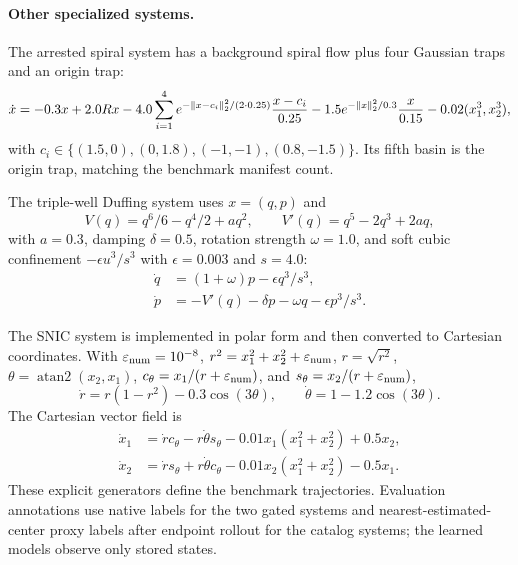 \paragraph{Other specialized systems.}
The arrested spiral system has a background spiral flow plus four Gaussian
traps and an origin trap:
\[
  \dot x
  =
  -0.3x+2.0Rx
  -4.0\sum_{i=1}^{4}
  e^{-\left\lVert x-c_i \right\rVert_2^2/(2\cdot0.25)}
  \frac{x-c_i}{0.25}
  -1.5e^{-\left\lVert x \right\rVert_2^2/0.3}\frac{x}{0.15}
  -0.02(x_1^3,x_2^3),
\]
with \(c_i\in\{(1.5,0),(0,1.8),(-1,-1),(0.8,-1.5)\}\). Its fifth basin is the
origin trap, matching the benchmark manifest count.

The triple-well Duffing system uses \(x=(q,p)\) and
\[
  V(q)=q^6/6-q^4/2+a q^2,\qquad
  V'(q)=q^5-2q^3+2a q,
\]
with \(a=0.3\), damping \(\delta=0.5\), rotation strength \(\omega=1.0\), and
soft cubic confinement \(-\epsilon u^3/s^3\) with \(\epsilon=0.003\) and
\(s=4.0\):
\begin{equation}
\begin{aligned}
  \dot q &= (1+\omega)p-\epsilon q^3/s^3,\\
  \dot p &= -V'(q)-\delta p-\omega q-\epsilon p^3/s^3 .
\end{aligned}
\label{eq:app_duffing_triple}
\end{equation}

The SNIC system is implemented in polar form and then converted to Cartesian
coordinates. With \(\varepsilon_{\rm num}=10^{-8}\),
\(r^2=x_1^2+x_2^2+\varepsilon_{\rm num}\), \(r=\sqrt{r^2}\),
\(\theta=\operatorname{atan2}(x_2,x_1)\),
\(c_\theta=x_1/(r+\varepsilon_{\rm num})\), and
\(s_\theta=x_2/(r+\varepsilon_{\rm num})\),
\[
  \dot r=r(1-r^2)-0.3\cos(3\theta),\qquad
  \dot\theta=1-1.2\cos(3\theta).
\]
The Cartesian vector field is
\[
\begin{aligned}
  \dot x_1
  &= \dot r c_\theta-r\dot\theta s_\theta
     -0.01x_1(x_1^2+x_2^2)+0.5x_2,\\
  \dot x_2
  &= \dot r s_\theta+r\dot\theta c_\theta
     -0.01x_2(x_1^2+x_2^2)-0.5x_1 .
\end{aligned}
\]
These explicit generators define the benchmark trajectories. Evaluation
annotations use native labels for the two gated systems and nearest-estimated-
center proxy labels after endpoint rollout for the catalog systems; the learned
models observe only stored states.
